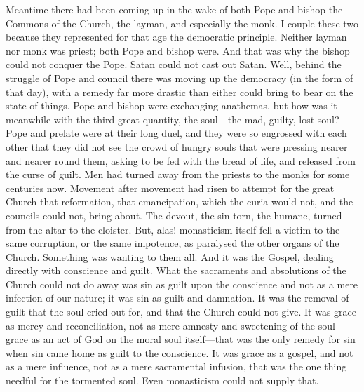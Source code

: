 \documentclass[12pt,a5paper,twoside]{book}
\begin{document}
Meantime there had been coming up in the wake 
of both Pope and bishop the Commons of the Church, 
the layman, and especially the monk. I couple 
these two because they represented for that age the 
democratic principle. Neither layman nor monk was 
priest; both Pope and bishop were. And that was 
why the bishop could not conquer the Pope. Satan 
could not cast out Satan. Well, behind the struggle 
of Pope and council there was moving up the democracy 
(in the form of that day), with a remedy far 
more drastic than either could bring to bear on the 
state of things. Pope and bishop were exchanging 
anathemas, but how was it meanwhile with the third 
great quantity, the soul---the mad, guilty, lost soul? 
Pope and prelate were at their long duel, and they 
were so engrossed with each other that they did not 
see the crowd of hungry souls that were pressing nearer 
and nearer round them, asking to be fed with the bread 
of life, and released from the curse of guilt. Men 
had turned away from the priests to the monks for 
some centuries now. Movement after movement had 
risen to attempt for the great Church that reformation, 
that emancipation, which the curia would not, 
and the councils could not, bring about. The devout, 
the sin-torn, the humane, turned from the altar to 
the cloister. But, alas! monasticism itself fell a victim 
to the same corruption, or the same impotence, as 
paralysed the other organs of the Church. Something 
was wanting to them all. And it was the Gospel, 
dealing directly with conscience and guilt. What the 
sacraments and absolutions of the Church could not 
do away was sin as guilt upon the conscience and not 
as a mere infection of our nature; it was sin as guilt 
and damnation. It was the removal of guilt that the 
soul cried out for, and that the Church could not give. 
It was grace as mercy and reconciliation, not as mere 
amnesty and sweetening of the soul---grace as an 
act of God on the moral soul itself---that was the only 
remedy for sin when sin came home as guilt to the 
conscience. It was grace as a gospel, and not as 
a mere influence, not as a mere sacramental infusion, 
that was the one thing needful for the tormented soul. 
Even monasticism could not supply that. 
\end{document}
